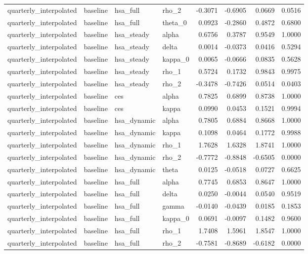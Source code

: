 \begin{tabular}{llllrrrr}
quarterly\_interpolated & baseline & hsa\_full & rho\_2 & -0.3071 & -0.6905 & 0.0669 & 0.0516 \\
quarterly\_interpolated & baseline & hsa\_full & theta\_0 & 0.0923 & -0.2860 & 0.4872 & 0.6800 \\
quarterly\_interpolated & baseline & hsa\_steady & alpha & 0.6756 & 0.3787 & 0.9549 & 1.0000 \\
quarterly\_interpolated & baseline & hsa\_steady & delta & 0.0014 & -0.0373 & 0.0416 & 0.5294 \\
quarterly\_interpolated & baseline & hsa\_steady & kappa\_0 & 0.0065 & -0.0666 & 0.0835 & 0.5628 \\
quarterly\_interpolated & baseline & hsa\_steady & rho\_1 & 0.5724 & 0.1732 & 0.9843 & 0.9975 \\
quarterly\_interpolated & baseline & hsa\_steady & rho\_2 & -0.3478 & -0.7426 & 0.0514 & 0.0403 \\
quarterly\_interpolated & baseline & ces & alpha & 0.7825 & 0.6899 & 0.8738 & 1.0000 \\
quarterly\_interpolated & baseline & ces & kappa & 0.0990 & 0.0453 & 0.1521 & 0.9994 \\
quarterly\_interpolated & baseline & hsa\_dynamic & alpha & 0.7805 & 0.6884 & 0.8668 & 1.0000 \\
quarterly\_interpolated & baseline & hsa\_dynamic & kappa & 0.1098 & 0.0464 & 0.1772 & 0.9988 \\
quarterly\_interpolated & baseline & hsa\_dynamic & rho\_1 & 1.7628 & 1.6328 & 1.8741 & 1.0000 \\
quarterly\_interpolated & baseline & hsa\_dynamic & rho\_2 & -0.7772 & -0.8848 & -0.6505 & 0.0000 \\
quarterly\_interpolated & baseline & hsa\_dynamic & theta & 0.0125 & -0.0518 & 0.0727 & 0.6625 \\
quarterly\_interpolated & baseline & hsa\_full & alpha & 0.7745 & 0.6853 & 0.8647 & 1.0000 \\
quarterly\_interpolated & baseline & hsa\_full & delta & 0.0250 & -0.0044 & 0.0540 & 0.9519 \\
quarterly\_interpolated & baseline & hsa\_full & gamma & -0.0140 & -0.0439 & 0.0185 & 0.1853 \\
quarterly\_interpolated & baseline & hsa\_full & kappa\_0 & 0.0691 & -0.0097 & 0.1482 & 0.9600 \\
quarterly\_interpolated & baseline & hsa\_full & rho\_1 & 1.7408 & 1.5961 & 1.8547 & 1.0000 \\
quarterly\_interpolated & baseline & hsa\_full & rho\_2 & -0.7581 & -0.8689 & -0.6182 & 0.0000 \\

\end{tabular}
